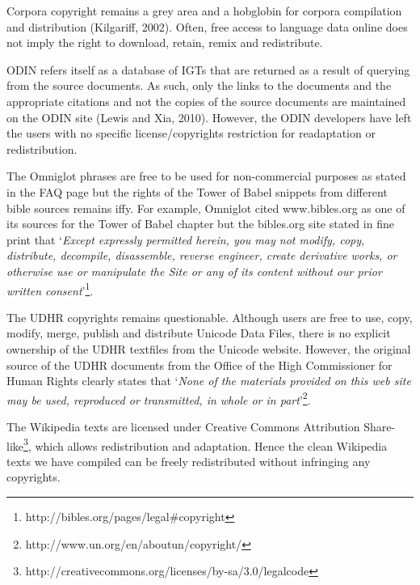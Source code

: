 \documentclass[11pt]{article}
\begin{document}
Corpora copyright remains a grey area and a hobglobin for corpora compilation and distribution (Kilgariff, 2002). Often, free access to language data online does not imply the right to download, retain, remix and redistribute. 

ODIN refers itself as a database of IGTs that are returned as a result of querying from the source documents. As such, only the links to the documents and the appropriate citations and not the copies of the source documents are maintained on the ODIN site (Lewis and Xia, 2010). However, the ODIN developers have left the users with no specific license/copyrights restriction for readaptation or redistribution. 

The Omniglot phrases are free to be used for non-commercial purposes as stated in the FAQ page but the rights of the Tower of Babel snippets from different bible sources remains iffy. For example, Omniglot cited www.bibles.org as one of its sources for the Tower of Babel chapter but the bibles.org site stated in fine print that `\emph{Except expressly permitted herein, you may not modify, copy, distribute, decompile, disassemble, reverse engineer, create derivative works, or otherwise use or manipulate the Site or any of its content without our prior written consent}'\footnote{http://bibles.org/pages/legal\#copyright}.

The UDHR copyrights remains questionable. Although users are free to use, copy, modify, merge, publish and distribute Unicode Data Files, there is no explicit ownership of the UDHR textfiles from the Unicode website. However, the original source of the UDHR documents from the Office of the High Commissioner for Human Rights clearly states that `\emph{None of the materials provided on this web site may be used, reproduced or transmitted, in whole or in part}'\footnote{http://www.un.org/en/aboutun/copyright/}.  

The Wikipedia texts are licensed under Creative Commons Attribution Share-like\footnote{http://creativecommons.org/licenses/by-sa/3.0/legalcode}, which allows redistribution and adaptation. Hence the clean Wikipedia texts we have compiled can be freely redistributed without infringing any copyrights. 

\end{document}
